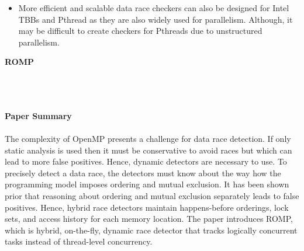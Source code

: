 \documentclass[20pt]{letter}
\begin{document}
\begin{enumerate}
{\begin{itemize}
    \item More efficient and scalable data race checkers can also be designed for Intel TBBs and Pthread as they are also widely used for parallelism. Although, it may be difficult to create checkers for Pthreads due to unstructured parallelism.
\end{itemize}
}


{ \Large
\item
\begin{center}
    \textbf{ROMP}
\end{center}
}
{ \fontsize{13}{13}\selectfont\\\\

\textbf{\\Paper Summary}\\\\
The complexity of OpenMP presents a challenge for data race detection. If only static analysis is used then it must be conservative to avoid races but which can lead to more false positives. Hence, dynamic detectors are necessary to use. To precisely detect a data race, the detectors must know about the way how the programming model imposes ordering and mutual exclusion. It has been shown prior that reasoning about ordering and mutual exclusion separately leads to false positives. Hence, hybrid race detectors maintain happens-before orderings, lock sets, and access history for each memory location. The paper introduces ROMP, which is hybrid, on-the-fly, dynamic race detector that tracks logically concurrent tasks instead of thread-level concurrency.\\
}
\end{enumerate}
\end{document}
